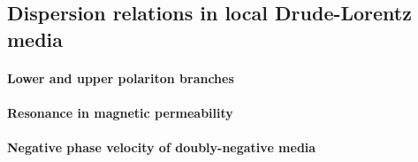 \subsection{Dispersion relations in local Drude-Lorentz media} \label{disp_rel_local_media}
\paragraph{Lower and upper polariton branches}  %
\paragraph{Resonance in magnetic permeability}  %
\paragraph{Negative phase velocity of doubly-negative media}  %

